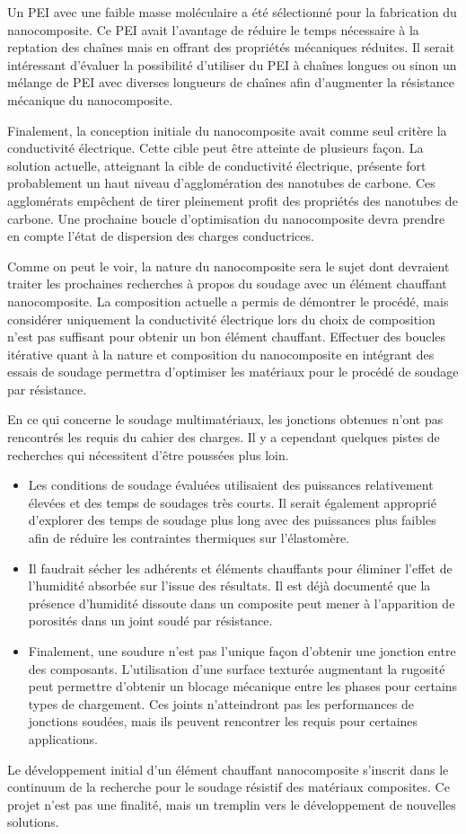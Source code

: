Un PEI avec une faible masse moléculaire a été sélectionné pour la fabrication du nanocomposite. 
Ce PEI avait l'avantage de réduire le temps nécessaire à la reptation des chaînes mais en offrant des propriétés mécaniques réduites. 
Il serait intéressant d'évaluer la possibilité d'utiliser du PEI à chaînes longues ou sinon un mélange de PEI avec diverses longueurs de chaînes afin d'augmenter la résistance mécanique du nanocomposite. 

Finalement, la conception initiale du nanocomposite avait comme seul critère la conductivité électrique. 
Cette cible peut être atteinte de plusieurs façon. 
La solution actuelle, atteignant la cible de conductivité électrique, présente fort probablement un haut niveau d'agglomération des nanotubes de carbone. 
Ces agglomérats empêchent de tirer pleinement profit des propriétés des nanotubes de carbone. 
Une prochaine boucle d'optimisation du nanocomposite devra prendre en compte l'état de dispersion des charges conductrices. 

Comme on peut le voir, la nature du nanocomposite sera le sujet dont devraient traiter les prochaines recherches à propos du soudage avec un élément chauffant nanocomposite. 
La composition actuelle a permis de démontrer le procédé, mais considérer uniquement la conductivité électrique lors du choix de composition n'est pas suffisant pour obtenir un bon élément chauffant.
Effectuer des boucles itérative quant à la nature et composition du nanocomposite en intégrant des essais de soudage permettra d'optimiser les matériaux pour le procédé de soudage par résistance. 

En ce qui concerne le soudage multimatériaux, les jonctions obtenues n'ont pas rencontrés les requis du cahier des charges. 
Il y a cependant quelques pistes de recherches qui nécessitent d'être poussées plus loin. 

\begin{itemize}
	\item Les conditions de soudage évaluées utilisaient des puissances relativement élevées et des temps de soudages très courts. 
	Il serait également approprié d'explorer des temps de soudage plus long avec des puissances plus faibles afin de réduire les contraintes thermiques sur l'élastomère. 
	\item Il faudrait sécher les adhérents et éléments chauffants pour éliminer l'effet de l'humidité absorbée sur l'issue des résultats. 
	Il est déjà documenté que la présence d'humidité dissoute dans un composite peut mener à l'apparition de porosités dans un joint soudé par résistance. 
	\item Finalement, une soudure n'est pas l'unique façon d'obtenir une jonction entre des composants. 
	L'utilisation d'une surface texturée augmentant la rugosité peut permettre d'obtenir un blocage mécanique entre les phases pour certains types de chargement. 
	Ces joints n'atteindront pas les performances de jonctions soudées, mais ils peuvent rencontrer les requis pour certaines applications. 
\end{itemize}

Le développement initial d'un élément chauffant nanocomposite s'inscrit dans le continuum de la recherche pour le soudage résistif des matériaux composites. 
Ce projet n'est pas une finalité, mais un tremplin vers le développement de nouvelles solutions. 